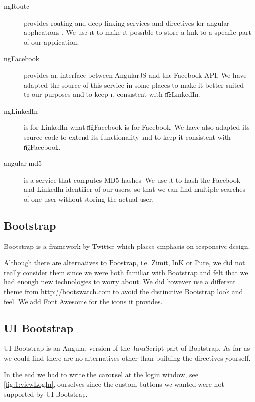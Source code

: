 			\begin{description}
				\item[ngRoute] provides routing and deep-linking services and directives for angular applications \cite{angulardocsngRoute}. We use it to make it possible to store a link to a specific part of our application. 
				\item[ngFacebook] provides an interface between AngularJS and the Facebook API. We have adapted the source of this service in some places to make it better suited to our purposes and to keep it consistent with \t{ngLinkedIn}.
				\item[ngLinkedIn] is for LinkedIn what \t{ngFacebook} is for Facebook. We have also adapted its source code to extend its functionality and to keep it consistent with \t{ngFacebook}.
				\item[angular-md5] is a service that computes MD5 hashes. We use it to hash the Facebook and LinkedIn identifier of our users, so that we can find multiple searches of one user without storing the actual user. 
			\end{description}

	\subsection{Bootstrap}
	\label{ssec:1:bootstrap}
		Bootstrap is a framework by Twitter which places emphasis on responsive design. 

		Although there are alternatives to Boostrap, i.e. Zimit, InK or Pure, we did not really consider them since we were both familiar with Bootstrap and felt that we had enough new technologies to worry about. We did however use a different theme from \url{http://bootswatch.com} to avoid the distinctive Bootstrap look and feel. We add Font Awesome for the icons it provides. 

	\subsection{UI Bootstrap}
	\label{ssec:1:bootstrapUI}
		UI Bootstrap is an Angular version of the JavaScript part of Bootstrap. As far as we could find there are no alternatives other than building the directives yourself. 

		In the end we had to write the carousel at the login window, see \vref{fig:1:viewLogIn}, ourselves since the custom buttons we wanted were not supported by UI Bootstrap.

